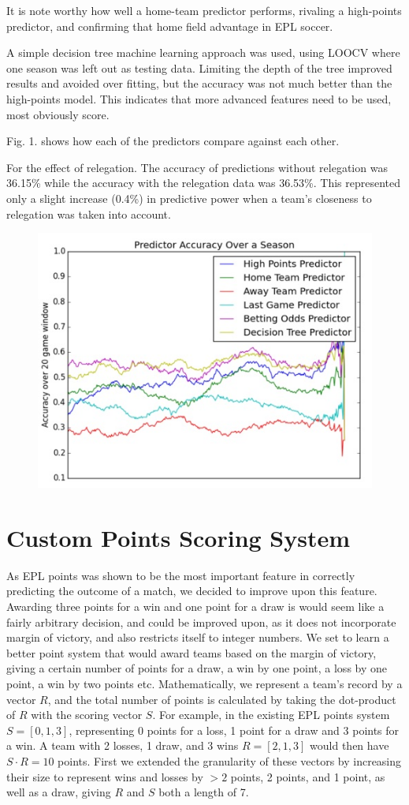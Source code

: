 \documentclass[conference]{IEEEtran}
\begin{document}
It is note worthy how well a home-team predictor performs, rivaling a high-points predictor, and confirming that home field advantage in EPL soccer.

A simple decision tree machine learning approach was used, using LOOCV where one season was left out as testing data. Limiting the depth of the tree improved results and avoided over fitting, but the accuracy was not much better than the high-points model. This indicates that more advanced features need to be used, most obviously score.

Fig. 1. shows how each of the predictors compare against each other. 

For the effect of relegation. The accuracy of predictions without relegation was 36.15\% while the accuracy with the relegation data was 36.53\%. This represented only a slight increase (0.4\%) in predictive power when a team's closeness to relegation was taken into account.

\begin{figure}[h]
\centering
\includegraphics[width=0.7\linewidth]{graph}
\caption{}
\label{fig:graph}
\end{figure}

\section{Custom Points Scoring System}
As EPL points was shown to be the most important feature in correctly predicting the outcome of a match, we decided to improve upon this feature. Awarding three points for a win and one point for a draw is would seem like a fairly arbitrary decision, and could be improved upon, as it does not incorporate margin of victory, and also restricts itself to integer numbers. We set to learn a better point system that would award teams based on the margin of victory, giving a certain number of points for a draw, a win by one point, a loss by one point, a win by two points etc. Mathematically, we represent a team's record by a vector $R$, and the total number of points is calculated by taking the dot-product of $R$ with the scoring vector $S$. For example, in the existing EPL points system $S=[0, 1, 3]$, representing 0 points for a loss, 1 point for a draw and 3 points for a win. A team with 2 losses, 1 draw, and 3 wins $R = [2,1,3]$ would then have $S \cdot R = 10$ points. First we extended the granularity of these vectors by increasing their size to represent wins and losses by $>2$ points, 2 points, and 1 point, as well as a draw, giving $R$ and $S$ both a length of 7. 
\end{document}
